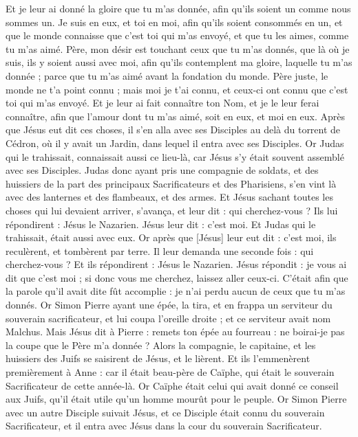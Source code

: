 \begin{multicols}{2}
Et je leur ai donné la gloire que tu m'as donnée, afin qu'ils soient un comme nous sommes un.
Je suis en eux, et toi en moi, afin qu'ils soient consommés en un, et que le monde connaisse que c'est toi qui m'as envoyé, et que tu les aimes, comme tu m'as aimé.
Père, mon désir est touchant ceux que tu m'as donnés, que là où je suis, ils y soient aussi avec moi, afin qu'ils contemplent ma gloire, laquelle tu m'as donnée ; parce que tu m'as aimé avant la fondation du monde.
Père juste, le monde ne t'a point connu ; mais moi je t'ai connu, et ceux-ci ont connu que c'est toi qui m'as envoyé.
Et je leur ai fait connaître ton Nom, et je le leur ferai connaître, afin que l'amour dont tu m'as aimé, soit en eux, et moi en eux.
\VerseOne{}Après que Jésus eut dit ces choses, il s'en alla avec ses Disciples au delà du torrent de Cédron, où il y avait un Jardin, dans lequel il entra avec ses Disciples.
Or Judas qui le trahissait, connaissait aussi ce lieu-là, car Jésus s'y était souvent assemblé avec ses Disciples.
Judas donc ayant pris une compagnie de soldats, et des huissiers de la part des principaux Sacrificateurs et des Pharisiens, s'en vint là avec des lanternes et des flambeaux, et des armes.
Et Jésus sachant toutes les choses qui lui devaient arriver, s'avança, et leur dit : qui cherchez-vous ?
Ils lui répondirent : Jésus le Nazarien. Jésus leur dit : c'est moi. Et Judas qui le trahissait, était aussi avec eux.
Or après que [Jésus] leur eut dit : c'est moi, ils reculèrent, et tombèrent par terre.
Il leur demanda une seconde fois : qui cherchez-vous ? Et ils répondirent : Jésus le Nazarien.
Jésus répondit : je vous ai dit que c'est moi ; si donc vous me cherchez, laissez aller ceux-ci.
C'était afin que la parole qu'il avait dite fût accomplie : je n'ai perdu aucun de ceux que tu m'as donnés.
Or Simon Pierre ayant une épée, la tira, et en frappa un serviteur du souverain sacrificateur, et lui coupa l'oreille droite ; et ce serviteur avait nom Malchus.
Mais Jésus dit à Pierre : remets ton épée au fourreau : ne boirai-je pas la coupe que le Père m'a donnée ?
Alors la compagnie, le capitaine, et les huissiers des Juifs se saisirent de Jésus, et le lièrent.
Et ils l'emmenèrent premièrement à Anne : car il était beau-père de Caïphe, qui était le souverain Sacrificateur de cette année-là.
Or Caïphe était celui qui avait donné ce conseil aux Juifs, qu'il était utile qu'un homme mourût pour le peuple.
Or Simon Pierre avec un autre Disciple suivait Jésus, et ce Disciple était connu du souverain Sacrificateur, et il entra avec Jésus dans la cour du souverain Sacrificateur.

\end{multicols}
